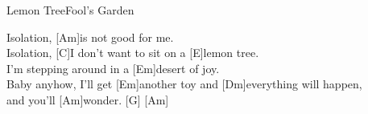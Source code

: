 \begin{song}{Lemon Tree}{Fool's Garden}
    \begin{bridge}
        [E]Isolation, [Am]is not good for me. \\
        [G]Isolation, [C]I don't want to sit on a [E]lemon tree. \\
        [Am]I'm stepping around in a [Em]desert of joy. \\
        [Am]Baby anyhow, I'll get [Em]another toy and [Dm]everything will happen, \\
        [Em] and you'll [Am]wonder. [G]  \hspace{1em}[Am]
    \end{bridge}


\end{song}

